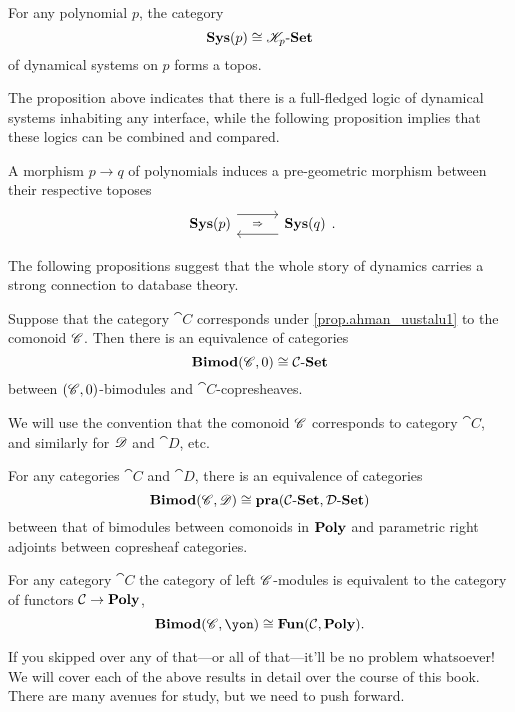 \documentclass[Book-Poly]{subfiles}
\begin{document}
\begin{proposition}\label{prop.sysp[i]s_topos}
For any polynomial $p$, the category
\[\textbf{Sys}(p)\cong\mathscr{K}_p\textnormal{-}\textbf{Set}\]
of dynamical systems on $p$ forms a topos.
\end{proposition}

The proposition above indicates that there is a full-fledged logic of dynamical systems inhabiting any interface, while the following proposition implies that these logics can be combined and compared.

\begin{proposition}\label{prop.poly_map_pregeo_topos}
A morphism $p\to q$ of polynomials induces a pre-geometric morphism between their respective toposes
\[
\adj{\sys(p)}{}{}{\sys(q)}.
\]
\end{proposition}

The following propositions suggest that the whole story of dynamics carries a strong connection to database theory.

\begin{proposition}
Suppose that the category $\cat{C}$ corresponds under \cref{prop.ahman_uustalu1} to the comonoid $\mathscr{C}$. Then there is an equivalence of categories
\[
\textbf{Bimod}(\mathscr{C},0)\cong\mathcal{C}\textnormal{-}\textbf{Set}
\]
between $(\mathscr{C},0)$-bimodules and $\cat{C}$-copresheaves.
\end{proposition}
We will use the convention that the comonoid $\mathscr{C}$ corresponds to category $\cat{C}$, and similarly for $\mathscr{D}$ and $\cat{D}$, etc. 

\begin{proposition}[Garner]
For any categories $\cat{C}$ and $\cat{D}$, there is an equivalence of categories
\[
\textbf{Bimod}(\mathscr{C},\mathscr{D})\cong\textbf{pra}(\mathcal{C}\textnormal{-}\textbf{Set},\mathcal{D}\textnormal{-}\textbf{Set})
\]
between that of bimodules between comonoids in $\textbf{Poly}$ and parametric right adjoints between copresheaf categories.
\end{proposition}

\begin{proposition}
For any category $\cat{C}$ the category of left $\mathscr{C}$-modules is equivalent to the category of functors $\mathcal{C}\to\textbf{Poly}$,
\[\Cat{Bimod}(\com{C},\yon)\cong\Cat{Fun}(\cat{C},\poly).\]
\end{proposition}

If you skipped over any of that---or all of that---it'll be no problem whatsoever! We will cover each of the above results in detail over the course of this book. There are many avenues for study, but we need to push forward.
\end{document}
